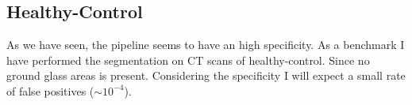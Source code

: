 
	\subsection{Healthy-Control}
	
	As we have seen, the pipeline seems to have an high specificity. As a benchmark I have performed the segmentation on CT scans of healthy-control. Since no ground glass areas is present. Considering the specificity I will expect a small rate of false positives ($\sim 10^{-4}$).

	
	
	
	


